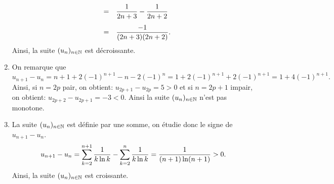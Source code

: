 \documentclass[a4paper, 11pt]{article}
\begin{document}
\begin{correction}
\begin{enumerate}
$$\begin{array}{lll}
&=& \ddp\frac{1}{2n+3}-\ddp\frac{1}{2n+2}\vsec\\
&=& \ddp\frac{-1}{(2n+3)(2n+2)}.
\end{array}$$
Ainsi, la suite $(u_n)_{n\in \mathbb{N}}$ est d\'ecroissante.
\item 
On remarque que
$$u_{n+1}-u_n=n+1+2(-1)^{n+1}-n-2(-1)^n=1+2(-1)^{n+1}+2(-1)^{n+1}=1+4(-1)^{n+1}.$$
Ainsi, si $n=2p$ pair, on obtient: $u_{2p+1}-u_{2p}=5>0$ et si $n=2p+1$ impair, on obtient: $u_{2p+2}-u_{2p+1}=-3<0$. Ainsi la suite $(u_n)_{n\in \mathbb{N}}$ n'est pas monotone.
\item La suite $(u_n)_{n\in \mathbb{N}}$ est d\'efinie par une somme, on \'etudie donc le signe de $u_{n+1}-u_n$.
$$u_{n+1}-u_n = \sum\limits_{k=2}^{n+1}\displaystyle\frac{1}{k \ln k}-\sum\limits_{k=2}^{n}\displaystyle\frac{1}{k \ln k} = \displaystyle\frac{1}{(n+1) \ln (n+1)} > 0.$$
Ainsi, la suite $(u_n)_{n\in \mathbb{N}}$ est croissante.
\end{enumerate}
\end{correction}



%
\end{document}
